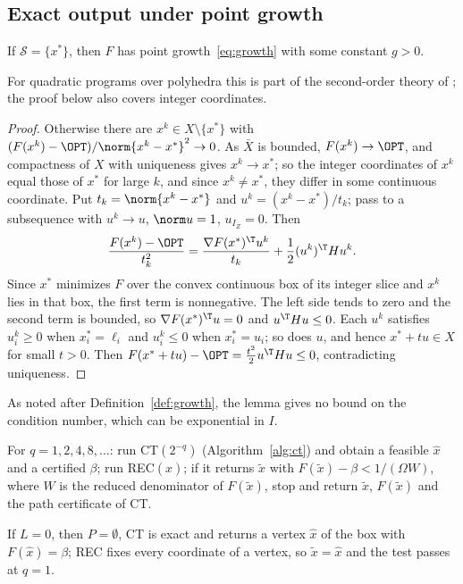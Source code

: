 \subsection{Exact output under point growth}\label{sec:exact-growth}

\begin{lemma}\label{lem:unique-growth}
If $\mathcal S=\{x^*\}$, then $F$ has point growth~\eqref{eq:growth} with
some constant $g>0$.
\end{lemma}

For quadratic programs over polyhedra this is part of the second-order theory
of \cite{Contesse1980}; the proof below also covers integer coordinates.

\begin{proof}
Otherwise there are $x^k\in X\setminus\{x^*\}$ with
$(F(x^k)-\OPT)/\norm{x^k-x^*}^2\to0$. As $\bar X$ is bounded,
$F(x^k)\to\OPT$, and compactness of $X$ with uniqueness gives $x^k\to x^*$;
so the integer coordinates of $x^k$ equal those of $x^*$ for large $k$, and
since $x^k\ne x^*$, they differ in some continuous coordinate. Put
$t_k=\norm{x^k-x^*}$ and $u^k=(x^k-x^*)/t_k$; pass to a subsequence with
$u^k\to u$, $\norm u=1$, $u_{I_Z}=0$. Then
\[
\frac{F(x^k)-\OPT}{t_k^2}=\frac{\nabla F(x^*)^{\T}u^k}{t_k}
+\frac12(u^k)^{\T}Hu^k .
\]
Since $x^*$ minimizes $F$ over the convex continuous box of its integer slice
and $x^k$ lies in that box, the first term is nonnegative. The left side
tends to zero and the second term is bounded, so
$\nabla F(x^*)^{\T}u=0$ and $u^{\T}Hu\le0$. Each $u^k$ satisfies
$u^k_i\ge0$ when $x^*_i=\ell_i$ and $u^k_i\le0$ when $x^*_i=u_i$; so does
$u$, and hence $x^*+tu\in X$ for small $t>0$. Then
$F(x^*+tu)-\OPT=\frac{t^2}2u^{\T}Hu\le0$, contradicting uniqueness.
\end{proof}

As noted after Definition~\ref{def:growth}, the lemma gives no bound on the
condition number, which can be exponential in $I$.

\begin{algorithm}\label{alg:ex}
For $q=1,2,4,8,\dots$: run CT$(2^{-q})$ (Algorithm~\ref{alg:ct}) and obtain a
feasible $\hat x$ and a certified $\beta$; run REC$(\hat x)$; if it returns
$\tilde x$ with $F(\tilde x)-\beta<1/(\Omega W)$, where $W$ is the reduced
denominator of $F(\tilde x)$, stop and return $\tilde x$, $F(\tilde x)$ and
the path certificate of CT.
\end{algorithm}

If $L=0$, then $P=\emptyset$, CT is exact and returns a vertex $\hat x$ of the
box with $F(\hat x)=\beta$; REC fixes every coordinate of a vertex, so
$\tilde x=\hat x$ and the test passes at $q=1$.

